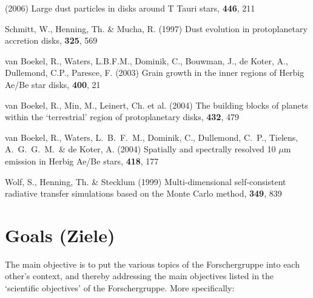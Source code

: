 \begin{ownpubl}
  (2006) Large dust particles in disks around T Tauri stars, 
  \aap \textbf{446}, 211
\item Schmitt, W., Henning, Th. \& Mucha, R. (1997) Dust evolution in
  protoplanetary accretion disks, \aap \textbf{325}, 569
\item van Boekel, R., Waters, L.B.F.M., Dominik, C., Bouwman, J., de Koter,
  A., Dullemond, C.P., Paresce, F. (2003) Grain growth in the inner regions of
  Herbig Ae/Be star disks, \aapl \textbf{400}, 21
\item van Boekel, R., Min, M., Leinert, Ch. et al. (2004) The building
  blocks of planets within the `terrestrial' region of protoplanetary disks,
  \nat \textbf{432}, 479
\item van Boekel, R., Waters, L.~B.~F.~M., Dominik, C., Dullemond, C.~P.,
  Tielens, A.~G.~G.~M.~\& de Koter, A. (2004) 
  Spatially and spectrally resolved 10 $\mu$m emission in
  Herbig Ae/Be stars, \aap \textbf{418}, 177
\item Wolf, S., Henning, Th. \& Stecklum (1999) Multi-dimensional
  self-consistent radiative transfer simulations based on the Monte
  Carlo method, \aap \textbf{349}, 839
\end{ownpubl}
%
%
%
%
\section{Goals (Ziele)}
The main objective is to put the various topics of the Forschergruppe into
each other's context, and thereby addressing the main objectives listed in
the `scientific objectives' of the Forschergruppe. More specifically:

